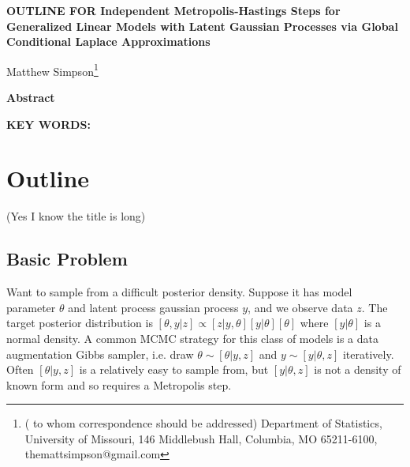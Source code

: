 \documentclass[12pt]{article}
\begin{document}
\thispagestyle{empty} \baselineskip=28pt

\begin{center}
{\LARGE{\bf OUTLINE FOR Independent Metropolis-Hastings Steps for Generalized Linear Models with Latent Gaussian Processes via Global Conditional Laplace Approximations}}
\end{center}

\baselineskip=12pt
\vskip 2mm
\blind
{
  \begin{center}
    Matthew Simpson\footnote{(\baselineskip=10pt to whom correspondence should be addressed)
      Department of Statistics, University of Missouri,
      146 Middlebush Hall, Columbia, MO 65211-6100, themattsimpson@gmail.com}
  \end{center}
} \fi

\vskip 2mm
\begin{center}
{\large{\bf Abstract}}
\end{center}

\baselineskip=12pt

\baselineskip=12pt
\par\vfill\noindent
{\bf KEY WORDS:}

\par\medskip\noindent


\clearpage\pagebreak\newpage {}
\baselineskip=24pt

\section{Outline}
(Yes I know the title is long)
\subsection{Basic Problem}
Want to sample from a difficult posterior density. Suppose it has model parameter $\theta$ and latent process gaussian process $y$, and we observe data $z$. The target posterior distribution is $[\theta, y|z] \propto [z|y,\theta][y|\theta][\theta]$ where $[y|\theta]$ is a normal density. A common MCMC strategy for this class of models is a data augmentation Gibbs sampler, i.e. draw $\theta \sim [\theta|y,z]$ and $y \sim [y|\theta,z]$ iteratively. Often $[\theta|y,z]$ is a relatively easy to sample from, but $[y|\theta,z]$ is not a density of known form and so requires a Metropolis step.
\end{document}
